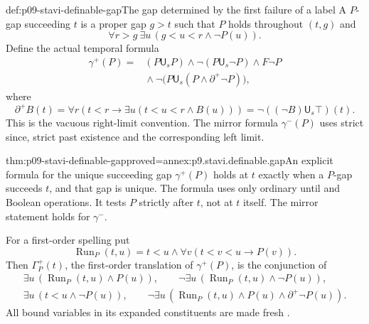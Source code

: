 \begin{hbdefinition}{def:p09-stavi-definable-gap}{The gap determined by the first failure of a label}
A \(P\)-gap succeeding \(t\) is a proper gap
\(g>t\) such that \(P\) holds throughout
\((t,g)\) and
\[
        \forall r>g\ \exists u\,
                     (g<u<r\land\neg P(u)).
\]
Define the actual temporal formula
\[
\begin{split}
 \gamma^+(P)={}&
 (P\mathbin{\mathsf U_s}P)
 \land\neg(P\mathbin{\mathsf U_s}\neg P)
 \land F\neg P\\
 &{}\land\neg\bigl(P\mathbin{\mathsf U_s}
                        (P\land\partial^+\neg P)\bigr),
\end{split}
\]
where
\[
 \partial^+B(t)=
 \forall r\left(t<r\to
                    \exists u(t<u<r\land B(u))\right)
       =\neg((\neg B)\mathbin{\mathsf U_s}\top)(t).
\]
This is the vacuous right-limit convention.
The mirror formula \(\gamma^-(P)\) uses
strict since, strict past existence and
the corresponding left limit.
\end{hbdefinition}

\begin{hblemma}{thm:p09-stavi-definable-gap}{proved=annex:p9.stavi.definable.gap}{An explicit formula for the unique succeeding gap}
\(\gamma^+(P)\) holds at \(t\) exactly
when a \(P\)-gap succeeds \(t\), and that
gap is unique. The formula uses only
ordinary until and Boolean operations.
It tests \(P\) strictly after \(t\),
not at \(t\) itself. The mirror statement
holds for \(\gamma^-\).

For a first-order spelling put
\[
 \operatorname{Run}_P(t,u)=
          t<u\land\forall v(t<v<u\to P(v)).
\]
Then \(\Gamma_P^+(t)\), the first-order
translation of \(\gamma^+(P)\), is the
conjunction of
\[
\begin{gathered}
 \exists u\,(\operatorname{Run}_P(t,u)\land P(u)),\qquad
 \neg\exists u\,(\operatorname{Run}_P(t,u)\land\neg P(u)),\\
 \exists u\,(t<u\land\neg P(u)),\qquad
 \neg\exists u\,(\operatorname{Run}_P(t,u)\land
                              P(u)\land\partial^+\neg P(u)).
\end{gathered}
\]
All bound variables in its expanded constituents
are made fresh \cite[pp.~4--5]{Rabinovich2018Stavi}.
\end{hblemma}

